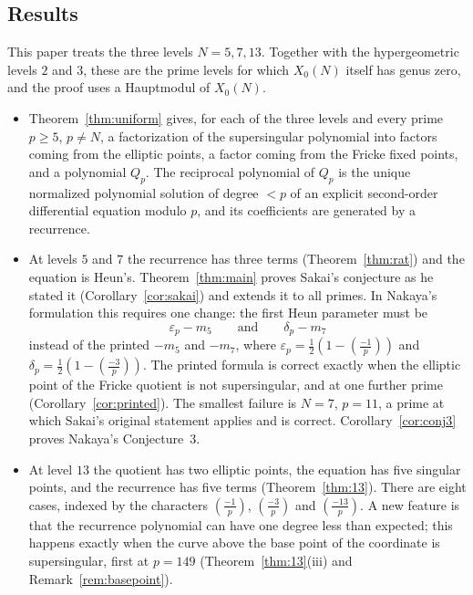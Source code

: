 \documentclass[11pt,a4paper]{article}
\theoremstyle{definition}
\theoremstyle{remark}
\newcommand{\leg}[2]{\left(\frac{#1}{#2}\right)}
\numberwithin{equation}{section}
\begin{document}
\subsection*{Results}
This paper treats the three levels $N=5,7,13$. Together with the
hypergeometric levels $2$ and $3$, these are the prime levels for which
$X_0(N)$ itself has genus zero, and the proof uses a Hauptmodul of $X_0(N)$.

\begin{itemize}
\item Theorem~\ref{thm:uniform} gives, for each of the three levels and every
prime $p\ge5$, $p\ne N$, a factorization of the supersingular polynomial into
factors coming from the elliptic points, a factor coming from the Fricke fixed
points, and a polynomial $Q_p$. The reciprocal polynomial of $Q_p$ is the
unique normalized polynomial solution of degree $<p$ of an explicit
second-order differential equation modulo $p$, and its coefficients are
generated by a recurrence.
\item At levels $5$ and $7$ the recurrence has three terms
(Theorem~\ref{thm:rat}) and the equation is Heun's. Theorem~\ref{thm:main}
proves Sakai's conjecture as he stated it (Corollary~\ref{cor:sakai}) and
extends it to all primes. In Nakaya's formulation this requires one change:
the first Heun parameter must be
\[
\varepsilon_p-m_5\qquad\text{and}\qquad\delta_p-m_7
\]
instead of the printed $-m_5$ and $-m_7$, where
$\varepsilon_p=\frac12(1-\leg{-1}{p})$ and $\delta_p=\frac12(1-\leg{-3}{p})$.
The printed formula is correct exactly when the elliptic point of the Fricke
quotient is not supersingular, and at one further prime
(Corollary~\ref{cor:printed}). The smallest failure is $N=7$, $p=11$, a prime
at which Sakai's original statement applies and is correct.
Corollary~\ref{cor:conj3} proves Nakaya's Conjecture~3.
\item At level $13$ the quotient has two elliptic points, the equation has
five singular points, and the recurrence has five terms
(Theorem~\ref{thm:13}). There are eight cases, indexed by the characters
$\leg{-1}{p}$, $\leg{-3}{p}$ and $\leg{-13}{p}$. A new feature is that the
recurrence polynomial can have one degree less than expected; this happens
exactly when the curve above the base point of the coordinate is supersingular,
first at $p=149$ (Theorem~\ref{thm:13}(iii) and Remark~\ref{rem:basepoint}).
\end{itemize}
\end{document}

